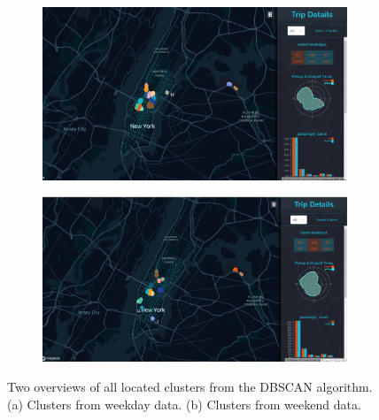 \documentclass[sigconf, authorversion, nonacm=true]{acmart}
\begin{document}
\begin{figure}[h]
  \centering
  \begin{subfigure}[b]{0.95\linewidth}
	  \includegraphics[width=\linewidth]{clusters_day}
  	  \caption{}
  	  \label{fig:clusters_day}
  \end{subfigure}
  
  \begin{subfigure}[b]{0.95\linewidth}
	  \includegraphics[width=\linewidth]{clusters_end}
	  \caption{}
	  \label{fig:clusters_end}
  \end{subfigure}
\caption{Two overviews of all located clusters from the DBSCAN algorithm. (a) Clusters from weekday data. (b) Clusters from weekend data.}
\end{figure}
\end{document}
